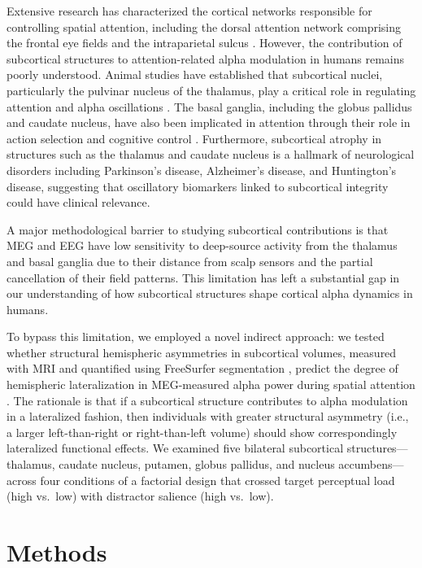\documentclass[12pt]{article}
\begin{document}
Extensive research has characterized the cortical networks responsible for controlling spatial attention, including the dorsal attention network comprising the frontal eye fields and the intraparietal sulcus \citep{corbetta2002control}. However, the contribution of subcortical structures to attention-related alpha modulation in humans remains poorly understood. Animal studies have established that subcortical nuclei, particularly the pulvinar nucleus of the thalamus, play a critical role in regulating attention and alpha oscillations \citep{saalmann2012pulvinar}. The basal ganglia, including the globus pallidus and caudate nucleus, have also been implicated in attention through their role in action selection and cognitive control \citep{desimone1995neural}. Furthermore, subcortical atrophy in structures such as the thalamus and caudate nucleus is a hallmark of neurological disorders including Parkinson's disease, Alzheimer's disease, and Huntington's disease, suggesting that oscillatory biomarkers linked to subcortical integrity could have clinical relevance.

A major methodological barrier to studying subcortical contributions is that MEG and EEG have low sensitivity to deep-source activity from the thalamus and basal ganglia due to their distance from scalp sensors and the partial cancellation of their field patterns. This limitation has left a substantial gap in our understanding of how subcortical structures shape cortical alpha dynamics in humans.

To bypass this limitation, we employed a novel indirect approach: we tested whether structural hemispheric asymmetries in subcortical volumes, measured with MRI and quantified using FreeSurfer segmentation \citep{fischl2002whole}, predict the degree of hemispheric lateralization in MEG-measured alpha power during spatial attention \citep{halassa2014thalamic}. The rationale is that if a subcortical structure contributes to alpha modulation in a lateralized fashion, then individuals with greater structural asymmetry (i.e., a larger left-than-right or right-than-left volume) should show correspondingly lateralized functional effects. We examined five bilateral subcortical structures---thalamus, caudate nucleus, putamen, globus pallidus, and nucleus accumbens---across four conditions of a factorial design that crossed target perceptual load (high vs.\ low) with distractor salience (high vs.\ low).

\section{Methods}
\end{document}
